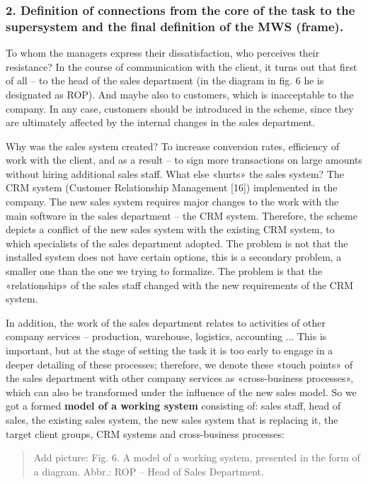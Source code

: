 \documentclass[11pt,a4paper]{book}
\newcommand{\addpicture}[1]{
  \begin{quote} Add picture: #1\end{quote}
}
\begin{document}
\subsubsection*{2. Definition of connections from the core of the task to the
  supersystem and the final definition of the MWS (frame).}

To whom the managers express their dissatisfaction, who perceives their
resistance? In the course of communication with the client, it turns out that
first of all -- to the head of the sales department (in the diagram in fig. 6
he is designated as ROP). And maybe also to customers, which is inacceptable
to the company. In any case, customers should be introduced in the scheme,
since they are ultimately affected by the internal changes in the sales
department.

Why was the sales system created? To increase conversion rates, efficiency of
work with the client, and as a result -- to sign more transactions on large
amounts without hiring additional sales staff. What else «hurts» the sales
system? The CRM system (Customer Relationship Management [16]) implemented in
the company. The new sales system requires major changes to the work with the
main software in the sales department -- the CRM system. Therefore, the scheme
depicts a conflict of the new sales system with the existing CRM system, to
which specialists of the sales department adopted. The problem is not that the
installed system does not have certain options, this is a secondary problem, a
smaller one than the one we trying to formalize. The problem is that the
«relationship» of the sales staff changed with the new requirements of the CRM
system.

In addition, the work of the sales department relates to activities of other
company services -- production, warehouse, logistics, accounting ... This is
important, but at the stage of setting the task it is too early to engage in a
deeper detailing of these processes; therefore, we denote these «touch points»
of the sales department with other company services as «cross-business
processes», which can also be transformed under the influence of the new sales
model. So we got a formed \textbf{model of a working system} consisting of:
sales staff, head of sales, the existing sales system, the new sales system
that is replacing it, the target client groups, CRM systems and cross-business
processes:

\addpicture{Fig. 6. A model of a working system, presented in the form of
  a diagram. Abbr.: ROP -- Head of Sales Department.}
\end{document}
